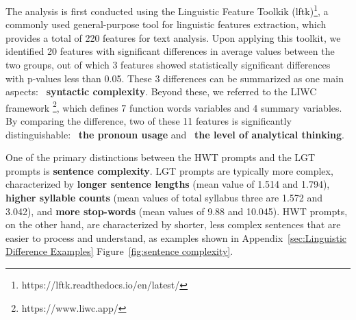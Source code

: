 The analysis is first conducted using the Linguistic Feature Toolkik (lftk)\footnote{https://lftk.readthedocs.io/en/latest/}, a commonly used general-purpose tool for linguistic features extraction, which provides a total of 220 features for text analysis. Upon applying this toolkit, we identified 20 features with significant differences in average values between the two groups, out of which 3 features showed statistically significant differences with p-values less than 0.05. These 3 differences can be summarized as one main aspects: ~\textbf{syntactic complexity}. Beyond these, we referred to the LIWC framework \footnote{https://www.liwc.app/}, which defines 7 function words variables and 4 summary variables. By comparing the difference, two of these 11 features is significantly distinguishable: ~\textbf{the pronoun usage} and ~\textbf{the level of analytical thinking}.


One of the primary distinctions between the HWT prompts and the LGT prompts is \textbf{sentence complexity}. LGT prompts are typically more complex, characterized by \textbf{longer sentence lengths} (mean value of 1.514 and 1.794), \textbf{higher syllable counts} (mean values of total syllabus three are 1.572 and 3.042), and \textbf{more stop-words} (mean values of 9.88 and 10.045). HWT prompts, on the other hand, are characterized by shorter, less complex sentences that are easier to process and understand, as examples shown in Appendix~\ref{sec:Linguistic Difference Examples} Figure~\ref{fig:sentence complexity}.


